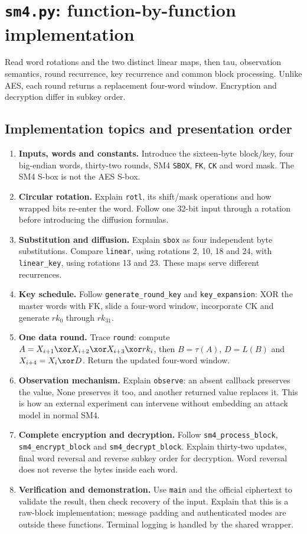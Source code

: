\section{\texttt{sm4.py}: function-by-function implementation}
Read word rotations and the two distinct linear maps, then tau, observation semantics, round recurrence, key recurrence and common block processing. Unlike AES, each round returns a replacement four-word window. Encryption and decryption differ in subkey order.

\subsection{Implementation topics and presentation order}
\begin{enumerate}
\item \textbf{Inputs, words and constants.} Introduce the sixteen-byte block/key, four big-endian words, thirty-two rounds, SM4 \texttt{SBOX}, \texttt{FK}, \texttt{CK} and word mask. The SM4 S-box is not the AES S-box.
\item \textbf{Circular rotation.} Explain \texttt{rotl}, its shift/mask operations and how wrapped bits re-enter the word. Follow one 32-bit input through a rotation before introducing the diffusion formulas.
\item \textbf{Substitution and diffusion.} Explain \texttt{sbox} as four independent byte substitutions. Compare \texttt{linear}, using rotations 2, 10, 18 and 24, with \texttt{linear\_key}, using rotations 13 and 23. These maps serve different recurrences.
\item \textbf{Key schedule.} Follow \texttt{generate\_round\_key} and \texttt{key\_expansion}: XOR the master words with FK, slide a four-word window, incorporate CK and generate $rk_0$ through $rk_{31}$.
\item \textbf{One data round.} Trace \texttt{round}: compute $A=X_{i+1}\xor X_{i+2}\xor X_{i+3}\xor rk_i$, then $B=\tau(A)$, $D=L(B)$ and $X_{i+4}=X_i\xor D$. Return the updated four-word window.
\item \textbf{Observation mechanism.} Explain \texttt{observe}: an absent callback preserves the value, None preserves it too, and another returned value replaces it. This is how an external experiment can intervene without embedding an attack model in normal SM4.
\item \textbf{Complete encryption and decryption.} Follow \texttt{sm4\_process\_block}, \texttt{sm4\_encrypt\_block} and \texttt{sm4\_decrypt\_block}. Explain thirty-two updates, final word reversal and reverse subkey order for decryption. Word reversal does not reverse the bytes inside each word.
\item \textbf{Verification and demonstration.} Use \texttt{main} and the official ciphertext to validate the result, then check recovery of the input. Explain that this is a raw-block implementation; message padding and authenticated modes are outside these functions. Terminal logging is handled by the shared wrapper.
\end{enumerate}
